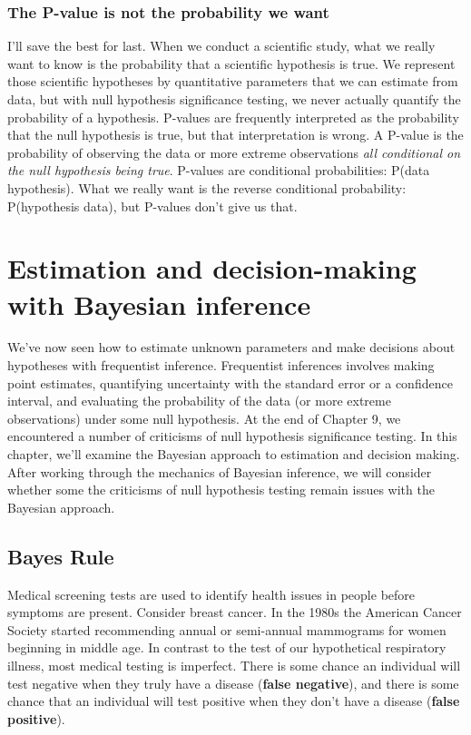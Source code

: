 \documentclass[
]{book}
\begin{document}
\subsection{The P-value is not the probability we want}\label{the-p-value-is-not-the-probability-we-want}

I'll save the best for last. When we conduct a scientific study, what we really want to know is the probability that a scientific hypothesis is true. We represent those scientific hypotheses by quantitative parameters that we can estimate from data, but with null hypothesis significance testing, we never actually quantify the probability of a hypothesis. P-values are frequently interpreted as the probability that the null hypothesis is true, but that interpretation is wrong. A P-value is the probability of observing the data or more extreme observations \emph{all conditional on the null hypothesis being true}. P-values are conditional probabilities: P(data \textbar{} hypothesis). What we really want is the reverse conditional probability: P(hypothesis \textbar{} data), but P-values don't give us that.

\chapter{Estimation and decision-making with Bayesian inference}\label{estimation-and-decision-making-with-bayesian-inference}

We've now seen how to estimate unknown parameters and make decisions
about hypotheses with frequentist inference. Frequentist inferences
involves making point estimates, quantifying uncertainty with the
standard error or a confidence interval, and evaluating the probability
of the data (or more extreme observations) under some null hypothesis.
At the end of Chapter 9, we encountered a number of criticisms of null
hypothesis significance testing. In this chapter, we'll examine the
Bayesian approach to estimation and decision making. After working
through the mechanics of Bayesian inference, we will consider whether
some the criticisms of null hypothesis testing remain issues with the
Bayesian approach.

\section{Bayes Rule}\label{bayes-rule}

Medical screening tests are used to identify health issues in people
before symptoms are present. Consider breast cancer. In the 1980s the
American Cancer Society started recommending annual or semi-annual
mammograms for women beginning in middle age. In contrast to the test of
our hypothetical respiratory illness, most medical testing is imperfect.
There is some chance an individual will test negative when they truly
have a disease (\textbf{false negative}), and there is some chance that an
individual will test positive when they don't have a disease (\textbf{false
positive}).
\end{document}

